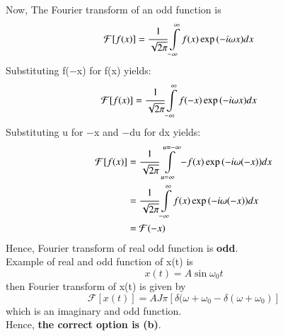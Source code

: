 \documentclass[journal,12pt,twocolumn]{IEEEtran}
\begin{document}
Now,
The Fourier transform of an odd function is
\begin{align}
    \mathcal{F}[f(x)] &= \cfrac{1}{\sqrt{2\pi}}\displaystyle\int\limits_{-\infty}^{\infty} f(x)\exp{(-i\omega x)}dx
\end{align}
Substituting f(−x) for f(x) yields:
\begin{align}
    \mathcal{F}[f(x)] &= \cfrac{1}{\sqrt{2\pi}}\displaystyle\int\limits_{-\infty}^{\infty} f(-x)\exp{(-i\omega x)}dx    
\end{align}
Substituting u for −x and −du for dx yields:
\begin{align}
    \mathcal{F}[f(x)] &= \cfrac{1}{\sqrt{2\pi}}\displaystyle\int\limits_{u=\infty}^{u=-\infty} -f(x)\exp{(-i\omega (-x))}dx\\
    &= \cfrac{1}{\sqrt{2\pi}}\displaystyle\int\limits_{-\infty}^{\infty} f(x)\exp{(-i\omega (-x))}dx\\
    &= \mathcal{F}(-x)
\end{align}
Hence,  Fourier transform of real odd function is \textbf{odd}.\\
Example of real and odd function of x(t) is
\begin{equation}
    x(t) = A\sin{\omega_{0}t}
\end{equation}
then Fourier transform of x(t) is given by
\begin{equation}
    \mathcal{F}[x(t)] = AJ\pi[\delta(\omega + \omega_{0} - \delta(\omega + \omega_{0})]
\end{equation}
which is an imaginary and odd function.\\
Hence, \textbf{the correct option is (b)}.
\end{document}
